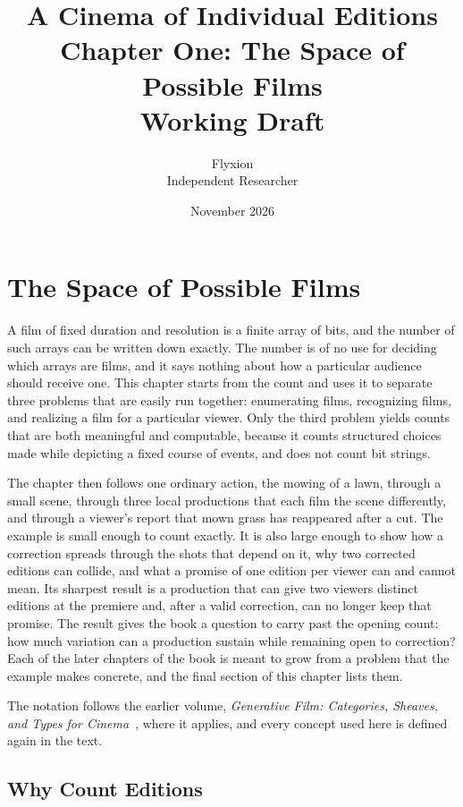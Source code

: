 \documentclass[11pt,twoside,openright]{book}
\title{\Huge\bfseries A Cinema of Individual Editions\\[1.2ex]
\large Chapter One: The Space of Possible Films\\[0.4ex]
\large Working Draft}
\author{Flyxion\\[0.3ex]\small Independent Researcher}
\date{November 2026}
\theoremstyle{plain}
\theoremstyle{definition}
\theoremstyle{remark}
\begin{document}
\frontmatter
\maketitle
\tableofcontents
\mainmatter

\chapter{The Space of Possible Films}
\label{ch:space}

A film of fixed duration and resolution is a finite array of bits, and the number of such arrays can be written down exactly. The number is of no use for deciding which arrays are films, and it says nothing about how a particular audience should receive one. This chapter starts from the count and uses it to separate three problems that are easily run together: enumerating films, recognizing films, and realizing a film for a particular viewer. Only the third problem yields counts that are both meaningful and computable, because it counts structured choices made while depicting a fixed course of events, and does not count bit strings.

The chapter then follows one ordinary action, the mowing of a lawn, through a small scene, through three local productions that each film the scene differently, and through a viewer's report that mown grass has reappeared after a cut. The example is small enough to count exactly. It is also large enough to show how a correction spreads through the shots that depend on it, why two corrected editions can collide, and what a promise of one edition per viewer can and cannot mean. Its sharpest result is a production that can give two viewers distinct editions at the premiere and, after a valid correction, can no longer keep that promise. The result gives the book a question to carry past the opening count: how much variation can a production sustain while remaining open to correction? Each of the later chapters of the book is meant to grow from a problem that the example makes concrete, and the final section of this chapter lists them.

The notation follows the earlier volume, \emph{Generative Film: Categories, Sheaves, and Types for Cinema}~\cite{flyxion2026gf}, where it applies, and every concept used here is defined again in the text.

\section{Why Count Editions}\label{sec:why}
\end{document}
